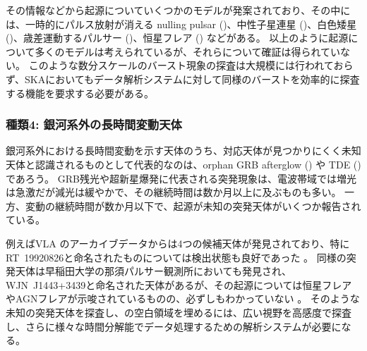 その情報などから起源についていくつかのモデルが発案されており、その中には、一時的にパルス放射が消える nulling pulsar (\citealp{2005Natur.434...28K})、中性子星連星 (\citealp{2005ApJ...628L..49T})、白色矮星 (\citealp{2005ApJ...631L.143Z})、歳差運動するパルサー (\citealp{2006MNRAS.365L..16Z})、恒星フレア (\citealp{2010ApJ...712L...5R}) などがある。
以上のように起源について多くのモデルは考えられているが、それらについて確証は得られていない。
このような数分スケールのバースト現象の探査は大規模には行われておらず、SKAにおいてもデータ解析システムに対して同様のバーストを効率的に探査する機能を要求する必要がある。

\subsubsection{種類4: 銀河系外の長時間変動天体}
銀河系外における長時間変動を示す天体のうち、対応天体が見つかりにくく未知天体と認識されるものとして代表的なのは、orphan GRB afterglow () や TDE () であろう。
GRB残光や超新星爆発に代表される突発現象は、電波帯域では増光は急激だが減光は緩やかで、その継続時間は数か月以上に及ぶものも多い。
一方、変動の継続時間が数か月以下で、起源が未知の突発天体がいくつか報告されている。

例えばVLA のアーカイブデータからは4つの候補天体が発見されており、特にRT~19920826と命名されたものについては検出状態も良好であった \citep{2007ApJ...666..346B,2012ApJ...747...70F}。%
同様の突発天体は早稲田大学の那須パルサー観測所においても発見され、WJN~J1443+3439と命名された天体があるが、その起源については恒星フレアやAGNフレアが示唆されているものの、必ずしもわかっていない \citep{2007ApJ...657L..37N,2014ApJ...781...10A}。
そのような未知の突発天体を探査し、の空白領域を埋めるには、広い視野を高感度で探査し、さらに様々な時間分解能でデータ処理するための解析システムが必要になる。

